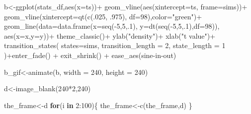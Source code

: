 \documentclass[
  letterpaper,
  DIV=11,
  numbers=noendperiod]{scrreprt}
\newenvironment{Shaded}{\begin{snugshade}}{\end{snugshade}}
\newcommand{\AttributeTok}[1]{\textcolor[rgb]{0.40,0.45,0.13}{#1}}
\newcommand{\ControlFlowTok}[1]{\textcolor[rgb]{0.00,0.23,0.31}{\textbf{#1}}}
\newcommand{\DecValTok}[1]{\textcolor[rgb]{0.68,0.00,0.00}{#1}}
\newcommand{\FunctionTok}[1]{\textcolor[rgb]{0.28,0.35,0.67}{#1}}
\newcommand{\NormalTok}[1]{\textcolor[rgb]{0.00,0.23,0.31}{#1}}
\newcommand{\OtherTok}[1]{\textcolor[rgb]{0.00,0.23,0.31}{#1}}
\newcommand{\SpecialCharTok}[1]{\textcolor[rgb]{0.37,0.37,0.37}{#1}}
\newcommand{\StringTok}[1]{\textcolor[rgb]{0.13,0.47,0.30}{#1}}
\begin{document}
\begin{Shaded}
\begin{Highlighting}[]
\NormalTok{b}\OtherTok{\textless{}{-}}\FunctionTok{ggplot}\NormalTok{(stats\_df,}\FunctionTok{aes}\NormalTok{(}\AttributeTok{x=}\NormalTok{ts))}\SpecialCharTok{+}
  \FunctionTok{geom\_vline}\NormalTok{(}\FunctionTok{aes}\NormalTok{(}\AttributeTok{xintercept=}\NormalTok{ts, }\AttributeTok{frame=}\NormalTok{sims))}\SpecialCharTok{+}
  \FunctionTok{geom\_vline}\NormalTok{(}\AttributeTok{xintercept=}\FunctionTok{qt}\NormalTok{(}\FunctionTok{c}\NormalTok{(.}\DecValTok{025}\NormalTok{, .}\DecValTok{975}\NormalTok{), }\AttributeTok{df=}\DecValTok{98}\NormalTok{),}\AttributeTok{color=}\StringTok{"green"}\NormalTok{)}\SpecialCharTok{+}
  \FunctionTok{geom\_line}\NormalTok{(}\AttributeTok{data=}\FunctionTok{data.frame}\NormalTok{(}\AttributeTok{x=}\FunctionTok{seq}\NormalTok{(}\SpecialCharTok{{-}}\DecValTok{5}\NormalTok{,}\DecValTok{5}\NormalTok{,.}\DecValTok{1}\NormalTok{),}
                            \AttributeTok{y=}\FunctionTok{dt}\NormalTok{(}\FunctionTok{seq}\NormalTok{(}\SpecialCharTok{{-}}\DecValTok{5}\NormalTok{,}\DecValTok{5}\NormalTok{,.}\DecValTok{1}\NormalTok{),}\AttributeTok{df=}\DecValTok{98}\NormalTok{)),}
            \FunctionTok{aes}\NormalTok{(}\AttributeTok{x=}\NormalTok{x,}\AttributeTok{y=}\NormalTok{y))}\SpecialCharTok{+}
  \FunctionTok{theme\_classic}\NormalTok{()}\SpecialCharTok{+}
  \FunctionTok{ylab}\NormalTok{(}\StringTok{"density"}\NormalTok{)}\SpecialCharTok{+}
  \FunctionTok{xlab}\NormalTok{(}\StringTok{"t value"}\NormalTok{)}\SpecialCharTok{+}
  \FunctionTok{transition\_states}\NormalTok{(}
    \AttributeTok{states=}\NormalTok{sims,}
    \AttributeTok{transition\_length =} \DecValTok{2}\NormalTok{,}
    \AttributeTok{state\_length =} \DecValTok{1}
\NormalTok{  )}\SpecialCharTok{+}\FunctionTok{enter\_fade}\NormalTok{() }\SpecialCharTok{+} 
  \FunctionTok{exit\_shrink}\NormalTok{() }\SpecialCharTok{+}
  \FunctionTok{ease\_aes}\NormalTok{(}\StringTok{\textquotesingle{}sine{-}in{-}out\textquotesingle{}}\NormalTok{)}

\NormalTok{b\_gif}\OtherTok{\textless{}{-}}\FunctionTok{animate}\NormalTok{(b, }\AttributeTok{width =} \DecValTok{240}\NormalTok{, }\AttributeTok{height =} \DecValTok{240}\NormalTok{)}


\NormalTok{d}\OtherTok{\textless{}{-}}\FunctionTok{image\_blank}\NormalTok{(}\DecValTok{240}\SpecialCharTok{*}\DecValTok{2}\NormalTok{,}\DecValTok{240}\NormalTok{)}

\NormalTok{the\_frame}\OtherTok{\textless{}{-}}\NormalTok{d}
\ControlFlowTok{for}\NormalTok{(i }\ControlFlowTok{in} \DecValTok{2}\SpecialCharTok{:}\DecValTok{100}\NormalTok{)\{}
\NormalTok{  the\_frame}\OtherTok{\textless{}{-}}\FunctionTok{c}\NormalTok{(the\_frame,d)}
\NormalTok{\}}


\end{Highlighting}
\end{Shaded}
\end{document}
